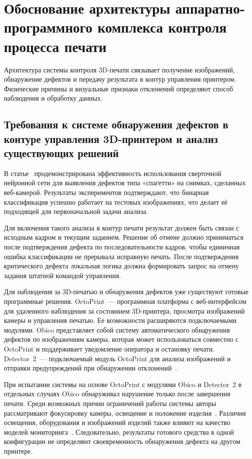 \chapter{Обоснование архитектуры аппаратно-программного комплекса контроля процесса печати}

Архитектура системы контроля 3D-печати связывает получение изображений, обнаружение дефектов и передачу результата в контур управления принтером. Физические причины и визуальные признаки отклонений определяют способ наблюдения и обработку данных.

\section{Требования к системе обнаружения дефектов в контуре управления 3D-принтером и анализ существующих решений}

В статье~\cite{kim2020image} продемонстрирована эффективность использования сверточной нейронной сети для выявления дефектов типа «спагетти» на снимках, сделанных веб-камерой. Результаты экспериментов подтверждают, что бинарная классификация успешно работает на тестовых изображениях, что делает её подходящей для первоначальной задачи анализа.

Для включения такого анализа в контур печати результат должен быть связан с исходным кадром и текущим заданием. Решение об отмене должно приниматься после подтверждения дефекта по последовательности кадров, чтобы единичная ошибка классификации не прерывала исправную печать. После подтверждения критического дефекта локальная логика должна формировать запрос на отмену задания штатной командой управления.

Для наблюдения за 3D-печатью и обнаружения дефектов уже существуют готовые программные решения. OctoPrint~--- программная платформа с веб-интерфейсом для удаленного наблюдения за состоянием 3D-принтера, просмотра изображений камеры и управления печатью. Ее возможности расширяются подключаемыми модулями. Obico представляет собой систему автоматического обнаружения дефектов по изображениям камеры, которая может использоваться совместно с OctoPrint и поддерживает уведомление оператора и остановку печати. Detector~2~--- подключаемый модуль OctoPrint для анализа изображений и отправки предупреждений при обнаружении отклонений~\cite{gabstur2024detection}.

При испытании системы на основе OctoPrint с модулями Obico и Detector~2 в отдельных случаях Obico обнаруживал нарушение только после завершения печати. Среди возможных причин ограничений работы системы авторы рассматривают фокусировку камеры, освещение и положение изделия~\cite{gabstur2024detection}. Различия освещения, оборудования и изображений изделий также влияют на качество моделей мониторинга~\cite{zhang2024domain}. Следовательно, результаты готового средства в одной конфигурации не определяют своевременность обнаружения дефекта на другом принтере.

